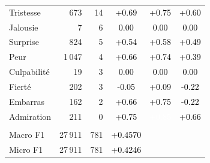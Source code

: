 \begin{tabular}{lrrccc}
Tristesse & 673 & 14 & \cellcolor[HTML]{E87737}\textcolor{black}{+0.69} & \cellcolor[HTML]{E4622D}\textcolor{black}{+0.75} & \cellcolor[HTML]{ED9347}\textcolor{black}{+0.60} \\
Jalousie & 7 & 6 & \cellcolor[HTML]{D3EEDE}\textcolor{black}{0.00} & \cellcolor[HTML]{D3EEDE}\textcolor{black}{0.00} & \cellcolor[HTML]{D3EEDE}\textcolor{black}{0.00} \\
Surprise & 824 & 5 & \cellcolor[HTML]{F0A853}\textcolor{black}{+0.54} & \cellcolor[HTML]{EE9B4B}\textcolor{black}{+0.58} & \cellcolor[HTML]{F1BB5E}\textcolor{black}{+0.49} \\
Peur & 1\,047 & 4 & \cellcolor[HTML]{EA833D}\textcolor{black}{+0.66} & \cellcolor[HTML]{E5662E}\textcolor{black}{+0.74} & \cellcolor[HTML]{EDED79}\textcolor{black}{+0.39} \\
Culpabilité & 19 & 3 & \cellcolor[HTML]{D3EEDE}\textcolor{black}{0.00} & \cellcolor[HTML]{D3EEDE}\textcolor{black}{0.00} & \cellcolor[HTML]{D3EEDE}\textcolor{black}{0.00} \\
Fierté & 202 & 3 & \cellcolor[HTML]{C9ECD1}\textcolor{black}{-0.05} & \cellcolor[HTML]{C0EBC4}\textcolor{black}{+0.09} & \cellcolor[HTML]{BFEAA3}\textcolor{black}{-0.22} \\
Embarras & 162 & 2 & \cellcolor[HTML]{E9803C}\textcolor{black}{+0.66} & \cellcolor[HTML]{E4632D}\textcolor{black}{+0.75} & \cellcolor[HTML]{BFEAA3}\textcolor{black}{-0.22} \\
Admiration & 211 & 0 & \cellcolor[HTML]{E5632D}\textcolor{black}{+0.75} & \cellcolor[HTML]{D93F20}\textcolor{white}{+0.85} & \cellcolor[HTML]{E9803C}\textcolor{black}{+0.66} \\
\midrule
\rowcolor[HTML]{3B3B3F}
\multicolumn{6}{l}{\textcolor{white}{\textbf{Métriques globales}}} \\
Macro F1 & 27\,911 & 781 & \cellcolor[HTML]{EFCC66}\textcolor{black}{+0.4570} & & \\
Micro F1 & 27\,911 & 781 & \cellcolor[HTML]{EEDC6F}\textcolor{black}{+0.4246} & & \\
\bottomrule
\end{tabular}
